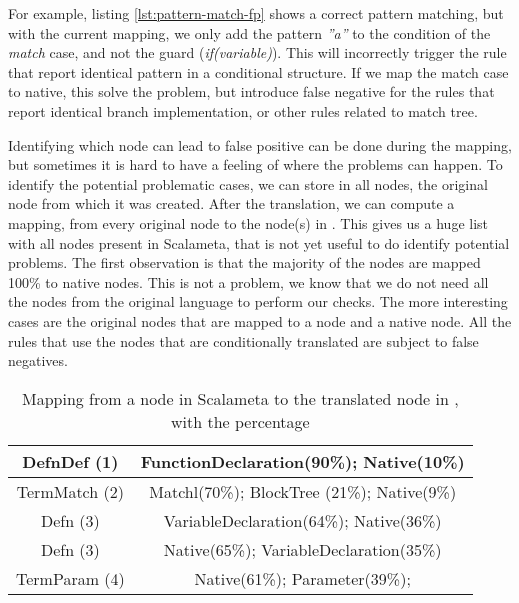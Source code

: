 

For example, listing \ref{lst:pattern-match-fp} shows a correct pattern matching, but with the current mapping, we only add the pattern \emph{”a”} to the condition of the \emph{match} case, and not the guard (\emph{if(variable)}). 
This will incorrectly trigger the rule that report identical pattern in a conditional structure. 
If we map the match case to native, this solve the problem, but introduce false negative for the rules that report identical branch implementation, or other rules related to match tree.

Identifying which node can lead to false positive can be done during the mapping, but sometimes it is hard to have a feeling of where the problems can happen. 
To identify the potential problematic cases, we can store in all nodes, the original node from which it was created. 
After the translation, we can compute a mapping, from every original node to the node(s) in \slang. 
This gives us a huge list with all nodes present in Scalameta, that is not yet useful to do identify potential problems. 
The first observation is that the majority of the nodes are mapped 100\% to native nodes. This is not a problem, we know that we do not need all the nodes from the original language to perform our checks. 
The more interesting cases are the original nodes that are mapped to a \slang{} node and a native node. 
All the rules that use the nodes that are conditionally translated are subject to false negatives.

\begin{table}[h]
	\centering
	\caption{Mapping from a node in Scalameta to the translated node in \slang{}, with the percentage}
	\label{table:interesting_mapping}
	\begin{tabular}{|c|c|}
		\hline
		DefnDef (1) &  FunctionDeclaration(90\%); Native(10\%) \\ \hline
		TermMatch (2) &  Matchl(70\%); BlockTree (21\%); Native(9\%) \\ \hline
		Defn (3) &  VariableDeclaration(64\%); Native(36\%) \\ \hline
		Defn (3) & Native(65\%); VariableDeclaration(35\%) \\ \hline
		TermParam (4) & Native(61\%); Parameter(39\%); \\ \hline
	\end{tabular}
\end{table}

